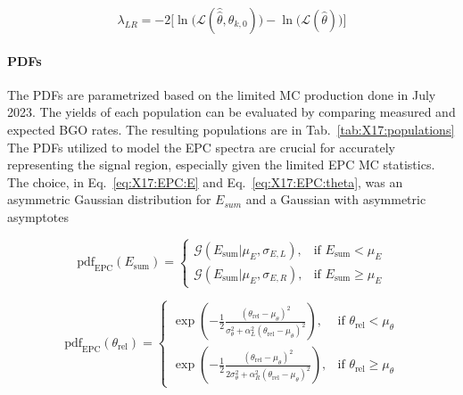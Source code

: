 \begin{refsection}
        \begin{equation}
        \label{eq:X17:LR}
            \lambda_{LR} = -2\biggl[\ln\bigl( \mathcal{L}(\hat{\hat{\theta}},\theta_{k,0}) \bigr) - \ln\bigl( \mathcal{L}(\hat{\theta}) \bigr)\biggr]
        \end{equation}
        
        \paragraph{PDFs}
        The PDFs are parametrized based on the limited MC production done in July 2023.
        The yields of each population can be evaluated by comparing measured and expected BGO rates. The resulting populations are in Tab.~\ref{tab:X17:populations}
        The PDFs utilized to model the EPC spectra are crucial for accurately representing the signal region, especially given the limited EPC MC statistics.
        The choice, in Eq.~\ref{eq:X17:EPC:E} and Eq.~\ref{eq:X17:EPC:theta}, was an asymmetric Gaussian distribution for $E_{sum}$ and a Gaussian with asymmetric asymptotes

        \begin{equation}
        \label{eq:X17:EPC:E}
            \text{pdf}_{\text{EPC}}(E_{\text{sum}}) = 
            \begin{cases}
                \mathcal{G}(E_{\text{sum}} | \mu_E, \sigma_{E,L}), & \text{if } E_{\text{sum}} < \mu_E \\
                \mathcal{G}(E_{\text{sum}} | \mu_E, \sigma_{E,R}), & \text{if } E_{\text{sum}} \geq \mu_E
            \end{cases}
        \end{equation}

        \begin{equation}
        \label{eq:X17:EPC:theta}
            \text{pdf}_{\text{EPC}}(\theta_{\text{rel}}) = 
            \begin{cases}
                \exp\left(-\frac{1}{2} \frac{(\theta_{\text{rel}} - \mu_{\theta})^2}{\sigma_{\theta}^2+\alpha_L^2(\theta_{\text{rel}} - \mu_{\theta})^2}\right), & \text{if } \theta_{\text{rel}} < \mu_{\theta} \\
                \exp\left(-\frac{1}{2} \frac{(\theta_{\text{rel}} - \mu_{\theta})^2}{2\sigma_{\theta}^2+\alpha_R^2(\theta_{\text{rel}} - \mu_{\theta})^2}\right), & \text{if } \theta_{\text{rel}} \geq \mu_{\theta} 
            \end{cases}
        \end{equation}


\end{refsection}
